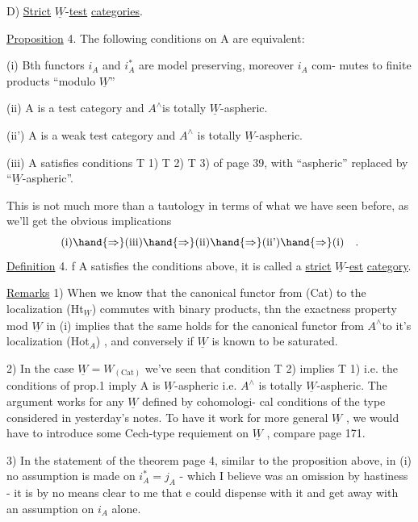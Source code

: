 
D) \uline{Strict} \uline{$\underline{W}$}-\uline{test} \uline{categories}.

\uline{Proposition} 4. The following conditions on A are equivalent:

(i) Bth functors $i_A$ and $i^*_A$ are model preserving, moreover $i_A$ com-%
mutes to finite products ``modulo $\underline{W}$'' \hand{,} 

(ii) A is a test category and $A^\wedge$\hand{/}is totally $\underline{W}$-aspheric.

(ii') A is a weak test category and $A^\wedge$ is totally $\underline{W}$-aspheric.

(iii) A satisfies conditions T 1) T 2) T 3) of page 39, with
``aspheric'' replaced by ``$\underline{W}$-aspheric''.

This is not much more than a tautology in terms of what we have
seen before, as we'll get the obvious implications
\[ \text{(i)} \hand{\Rightarrow} \text{(iii)} \hand{\Rightarrow} \text{(ii)} \hand{\Rightarrow} \text{(ii')} \hand{\Rightarrow} \text{(i)} \quad . \]
\uline{Definition} 4. f A satisfies the conditions above, it is called a
\uline{strict} \uline{$\underline{W}$}-\uline{est} \uline{category}.

\uline{Remarks} 1) When we know that the canonical functor from (Cat) to
the localization (Ht$_{\underline{W}}$) commutes with binary products, 
 thn the exactness property mod $\underline{W}$ in (i) implies that
the same holds for the canonical functor from $A^\wedge$\hand{/}to it's localization
(Hot$_A$) , and conversely if $\underline{W}$ is known to be saturated.

2) In the case $\underline{W} = W_{(\mathrm{Cat})}$ we've seen that condition T 2) implies
T 1) i.e. the conditions of prop.1 imply A is $\underline{W}$-aspheric i.e. $A^\wedge$ is
totally $\underline{W}$-aspheric. The argument works for any $\underline{W}$ defined by cohomologi-%
cal conditions of the type considered in yesterday's notes. To have it
work for more general $\underline{W}$ , we would have to introduce some \hand{\v{}}Cech-type
requiement on $\underline{W}$ , compare page 171.

3)  In the statement of the theorem page 4, similar to
the proposition above, in (i) no assumption is made on $i^*_A = j_A$ - which
I believe was an omission by hastiness - it is by no means clear to me
that e could dispense with it\hand{,} and get away with an assumption on $i_A$ 
alone.


